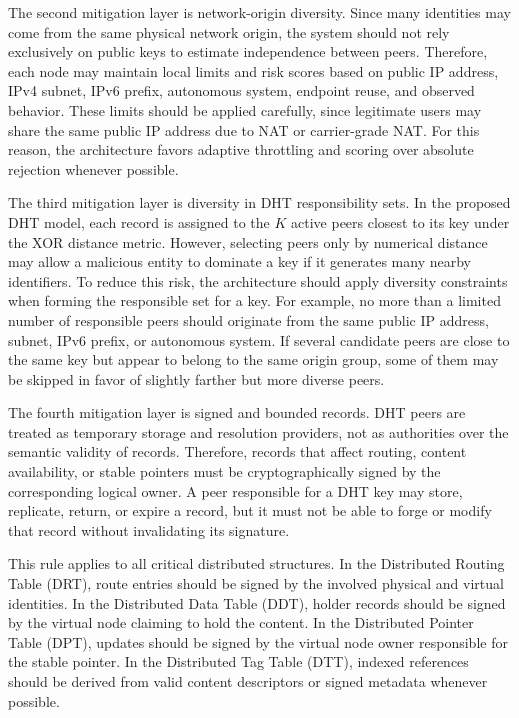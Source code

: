 \documentclass[12pt,a4paper]{article}
\begin{document}
The second mitigation layer is network-origin diversity. Since many identities may
come from the same physical network origin, the system should not rely exclusively
on public keys to estimate independence between peers. Therefore, each node may
maintain local limits and risk scores based on public IP address, IPv4 subnet, IPv6
prefix, autonomous system, endpoint reuse, and observed behavior. These limits
should be applied carefully, since legitimate users may share the same public IP
address due to NAT or carrier-grade NAT. For this reason, the architecture favors
adaptive throttling and scoring over absolute rejection whenever possible.

The third mitigation layer is diversity in DHT responsibility sets. In the proposed
DHT model, each record is assigned to the \(K\) active peers closest to its key under
the XOR distance metric. However, selecting peers only by numerical distance may
allow a malicious entity to dominate a key if it generates many nearby identifiers.
To reduce this risk, the architecture should apply diversity constraints when forming
the responsible set for a key. For example, no more than a limited number of
responsible peers should originate from the same public IP address, subnet, IPv6
prefix, or autonomous system. If several candidate peers are close to the same key
but appear to belong to the same origin group, some of them may be skipped in favor
of slightly farther but more diverse peers.

The fourth mitigation layer is signed and bounded records. DHT peers are treated as
temporary storage and resolution providers, not as authorities over the semantic
validity of records. Therefore, records that affect routing, content availability,
or stable pointers must be cryptographically signed by the corresponding logical
owner. A peer responsible for a DHT key may store, replicate, return, or expire a
record, but it must not be able to forge or modify that record without invalidating
its signature.

This rule applies to all critical distributed structures. In the Distributed Routing
Table (DRT), route entries should be signed by the involved physical and virtual
identities. In the Distributed Data Table (DDT), holder records should be signed by
the virtual node claiming to hold the content. In the Distributed Pointer Table
(DPT), updates should be signed by the virtual node owner responsible for the stable
pointer. In the Distributed Tag Table (DTT), indexed references should be derived
from valid content descriptors or signed metadata whenever possible.
\end{document}
